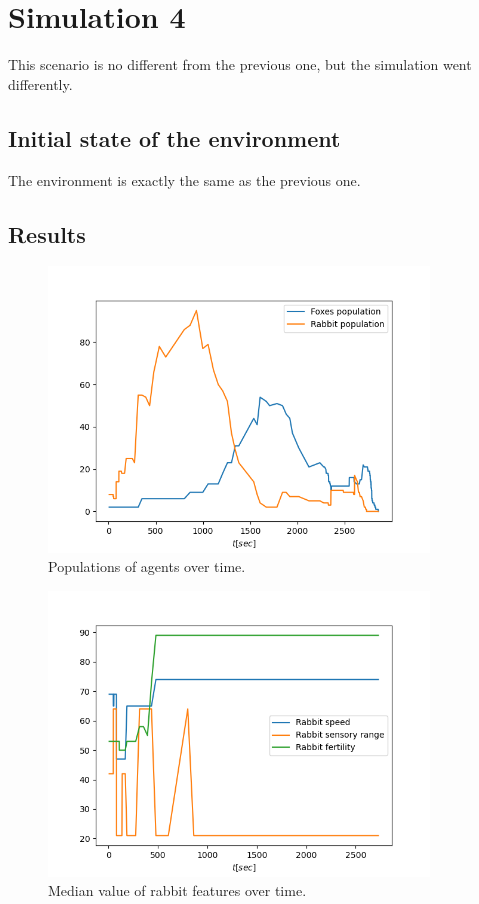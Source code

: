 \newpage
\section{Simulation 4}
\label{Simulation4}
This scenario is no different from the previous one, but the simulation went differently.
\subsection{Initial state of the environment}
The environment is exactly the same as the previous one.

\subsection{Results}

\begin{figure}[H]
    \centering
    \includegraphics[width=0.9\textwidth]{Images/SimulationResults/Simulation_6_Foxes population_Rabbit population.png}
    \caption{Populations of agents over time.}
    \label{fig:simulation4Pupulations}
\end{figure}

\begin{figure}[H]
    \centering
    \includegraphics[width=0.9\textwidth]{Images/SimulationResults/Simulation_6_Rabbit speed_Rabbit sensory range_Rabbit fertility.png}
    \caption{Median value of rabbit features over time.}
    \label{fig:simulation4RabbitFeaturesMedian}
\end{figure}

